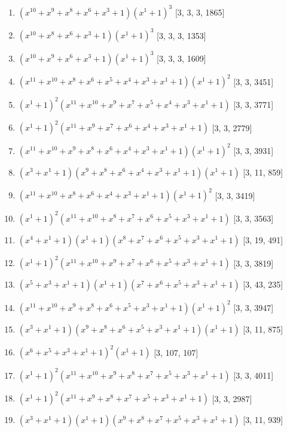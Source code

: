 \documentclass[10pt,twocolumn]{article}
\begin{document}
\begin{enumerate}
\item $(x^{10} + x^{9} + x^{8} + x^{6} + x^{3} + 1)(x^{1} + 1)^{3}$  [3, 3, 3, 1865]
\item $(x^{10} + x^{8} + x^{6} + x^{3} + 1)(x^{1} + 1)^{3}$  [3, 3, 3, 1353]
\item $(x^{10} + x^{9} + x^{6} + x^{3} + 1)(x^{1} + 1)^{3}$  [3, 3, 3, 1609]
\item $(x^{11} + x^{10} + x^{8} + x^{6} + x^{5} + x^{4} + x^{3} + x^{1} + 1)(x^{1} + 1)^{2}$  [3, 3, 3451]
\item $(x^{1} + 1)^{2}(x^{11} + x^{10} + x^{9} + x^{7} + x^{5} + x^{4} + x^{3} + x^{1} + 1)$  [3, 3, 3771]
\item $(x^{1} + 1)^{2}(x^{11} + x^{9} + x^{7} + x^{6} + x^{4} + x^{3} + x^{1} + 1)$  [3, 3, 2779]
\item $(x^{11} + x^{10} + x^{9} + x^{8} + x^{6} + x^{4} + x^{3} + x^{1} + 1)(x^{1} + 1)^{2}$  [3, 3, 3931]
\item $(x^{3} + x^{1} + 1)(x^{9} + x^{8} + x^{6} + x^{4} + x^{3} + x^{1} + 1)(x^{1} + 1)$  [3, 11, 859]
\item $(x^{11} + x^{10} + x^{8} + x^{6} + x^{4} + x^{3} + x^{1} + 1)(x^{1} + 1)^{2}$  [3, 3, 3419]
\item $(x^{1} + 1)^{2}(x^{11} + x^{10} + x^{8} + x^{7} + x^{6} + x^{5} + x^{3} + x^{1} + 1)$  [3, 3, 3563]
\item $(x^{4} + x^{1} + 1)(x^{1} + 1)(x^{8} + x^{7} + x^{6} + x^{5} + x^{3} + x^{1} + 1)$  [3, 19, 491]
\item $(x^{1} + 1)^{2}(x^{11} + x^{10} + x^{9} + x^{7} + x^{6} + x^{5} + x^{3} + x^{1} + 1)$  [3, 3, 3819]
\item $(x^{5} + x^{3} + x^{1} + 1)(x^{1} + 1)(x^{7} + x^{6} + x^{5} + x^{3} + x^{1} + 1)$  [3, 43, 235]
\item $(x^{11} + x^{10} + x^{9} + x^{8} + x^{6} + x^{5} + x^{3} + x^{1} + 1)(x^{1} + 1)^{2}$  [3, 3, 3947]
\item $(x^{3} + x^{1} + 1)(x^{9} + x^{8} + x^{6} + x^{5} + x^{3} + x^{1} + 1)(x^{1} + 1)$  [3, 11, 875]
\item $(x^{6} + x^{5} + x^{3} + x^{1} + 1)^{2}(x^{1} + 1)$  [3, 107, 107]
\item $(x^{1} + 1)^{2}(x^{11} + x^{10} + x^{9} + x^{8} + x^{7} + x^{5} + x^{3} + x^{1} + 1)$  [3, 3, 4011]
\item $(x^{1} + 1)^{2}(x^{11} + x^{9} + x^{8} + x^{7} + x^{5} + x^{3} + x^{1} + 1)$  [3, 3, 2987]
\item $(x^{3} + x^{1} + 1)(x^{1} + 1)(x^{9} + x^{8} + x^{7} + x^{5} + x^{3} + x^{1} + 1)$  [3, 11, 939]

\end{enumerate}
\end{document}
